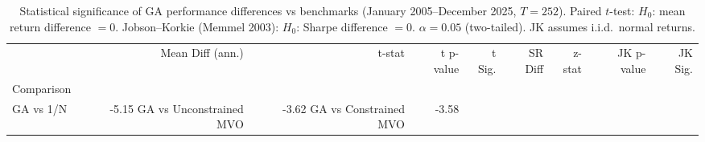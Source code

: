 \begin{table}
\caption{Statistical significance of GA performance differences vs benchmarks (January 2005--December 2025, $T=252$). Paired $t$-test: $H_0$: mean return difference $= 0$. Jobson--Korkie (Memmel 2003): $H_0$: Sharpe difference $= 0$. $\alpha = 0.05$ (two-tailed). JK assumes i.i.d.\ normal returns.}
\label{tab:significance}
\begin{tabular}{lrrrrrrrr}
\toprule
 & Mean Diff (ann.) & t-stat & t p-value & t Sig. & SR Diff & z-stat & JK p-value & JK Sig. \\
Comparison &  &  &  &  &  &  &  &  \\
\midrule
GA vs 1/N & -5.15%
GA vs Unconstrained MVO & -3.62%
GA vs Constrained MVO & -3.58%
\bottomrule
\end{tabular}
\end{table}
